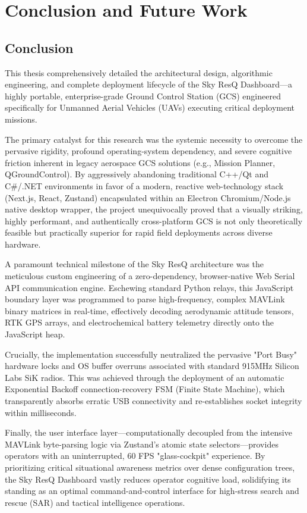 \chapter{Conclusion and Future Work}

\section{Conclusion}
This thesis comprehensively detailed the architectural design, algorithmic engineering, and complete deployment lifecycle of the Sky ResQ Dashboard—a highly portable, enterprise-grade Ground Control Station (GCS) engineered specifically for Unmanned Aerial Vehicles (UAVs) executing critical deployment missions. 

The primary catalyst for this research was the systemic necessity to overcome the pervasive rigidity, profound operating-system dependency, and severe cognitive friction inherent in legacy aerospace GCS solutions (e.g., Mission Planner, QGroundControl). By aggressively abandoning traditional C++/Qt and C\#/.NET environments in favor of a modern, reactive web-technology stack (Next.js, React, Zustand) encapsulated within an Electron Chromium/Node.js native desktop wrapper, the project unequivocally proved that a visually striking, highly performant, and authentically cross-platform GCS is not only theoretically feasible but practically superior for rapid field deployments across diverse hardware.

A paramount technical milestone of the Sky ResQ architecture was the meticulous custom engineering of a zero-dependency, browser-native Web Serial API communication engine. Eschewing standard Python relays, this JavaScript boundary layer was programmed to parse high-frequency, complex MAVLink binary matrices in real-time, effectively decoding aerodynamic attitude tensors, RTK GPS arrays, and electrochemical battery telemetry directly onto the JavaScript heap. 

Crucially, the implementation successfully neutralized the pervasive "Port Busy" hardware locks and OS buffer overruns associated with standard 915MHz Silicon Labs SiK radios. This was achieved through the deployment of an automatic Exponential Backoff connection-recovery FSM (Finite State Machine), which transparently absorbs erratic USB connectivity and re-establishes socket integrity within milliseconds. 

Finally, the user interface layer—computationally decoupled from the intensive MAVLink byte-parsing logic via Zustand's atomic state selectors—provides operators with an uninterrupted, 60 FPS "glass-cockpit" experience. By prioritizing critical situational awareness metrics over dense configuration trees, the Sky ResQ Dashboard vastly reduces operator cognitive load, solidifying its standing as an optimal command-and-control interface for high-stress search and rescue (SAR) and tactical intelligence operations.

